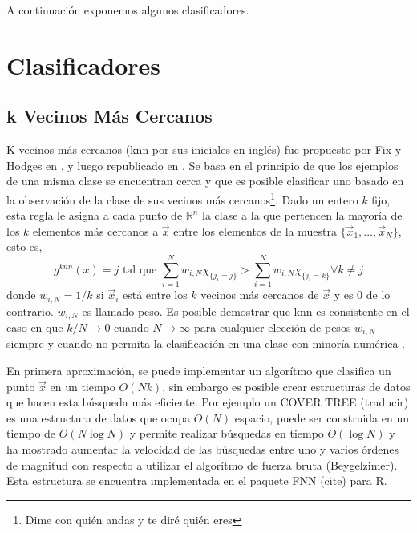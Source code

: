 \documentclass[letterpaper,12pt]{book}
\begin{document}
A continuación exponemos algunos clasificadores.

\section{Clasificadores}

\subsection{k Vecinos Más Cercanos}

K vecinos más cercanos (knn por sus iniciales en inglés) fue propuesto por Fix y Hodges en \cite{fix_discriminatory_1951}, y luego republicado en  \cite{silverman_e._1989}. Se basa en el principio de que los ejemplos de una misma clase se encuentran cerca y que es posible clasificar uno basado en la observación de la clase de sus vecinos más cercanos\footnote{Dime con quién andas y te diré quién eres}. Dado un entero $k$ fijo, esta regla le asigna a cada punto de $\mathbb{R}^n$ la clase a la que pertencen la mayoría de los $k$ elementos más cercanos a $\vec{x}$ entre los elementos de la muestra $\{\vec{x}_1, \dots,\vec{x}_N\}$, esto es,
\begin{equation}\label{eq:knnRule}
 g^{knn}(x) = j  \text{ tal que } \sum_{i=1}^{N}w_{i,N}\chi_{\{j_i = j\}} > \sum_{i=1}^{N}w_{i,N}\chi_{\{j_i = k\}}\forall k\neq j
\end{equation} 
donde $w_{i,N} = 1/k$ si $\vec{x}_i$ está entre los $k$ vecinos más cercanos de $\vec{x}$ y es $0$ de lo contrario. $w_{i,N}$ es llamado peso. Es posible demostrar que knn es consistente en el caso en que $k/N\to 0$ cuando $N\to \infty$ para cualquier elección de pesos $w_{i,N}$ siempre y cuando no permita la clasificación en una clase con minoría numérica \cite{devroye_probabilistic_1996}.

En primera aproximación, se puede implementar un algorítmo que clasifica un punto $\vec{x}$ en un tiempo $O(Nk)$, sin embargo es posible crear estructuras de datos que hacen esta búsqueda más eficiente. Por ejemplo un COVER TREE (traducir)\cite{beygelzimer_cover_2006} es una estructura de datos que ocupa $O(N)$ espacio, puede ser construida en un tiempo de $O(N\log{N})$ y permite realizar búsquedas en tiempo $O(\log{N})$ y ha mostrado aumentar la velocidad de las búsquedas entre uno y varios órdenes de magnitud con respecto a utilizar el algorítmo de fuerza bruta (Beygelzimer). Esta estructura se encuentra implementada en el paquete FNN (cite) para R.
\end{document}

